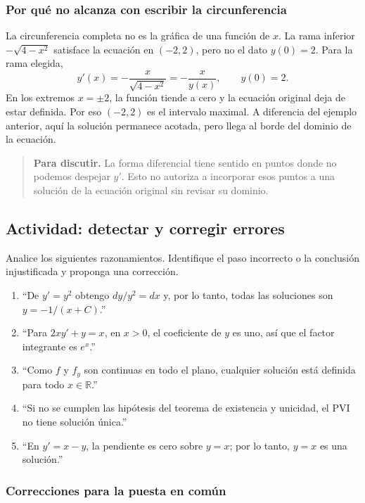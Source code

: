 \documentclass[12pt,a4paper]{article}
\begin{document}
	\subsubsection*{Por qué no alcanza con escribir la circunferencia}

	La circunferencia completa no es la gráfica de una función de \(x\). La rama inferior \(-\sqrt{4-x^2}\) satisface la ecuación en \((-2,2)\), pero no el dato \(y(0)=2\). Para la rama elegida,
	\[
	y'(x)=-\frac{x}{\sqrt{4-x^2}}=-\frac{x}{y(x)},
	\qquad y(0)=2.
	\]
	En los extremos \(x=\pm2\), la función tiende a cero y la ecuación original deja de estar definida. Por eso \((-2,2)\) es el intervalo maximal. A diferencia del ejemplo anterior, aquí la solución permanece acotada, pero llega al borde del dominio de la ecuación.

	\begin{quote}
		\textbf{Para discutir.} La forma diferencial tiene sentido en puntos donde no podemos despejar \(y'\). Esto no autoriza a incorporar esos puntos a una solución de la ecuación original sin revisar su dominio.
	\end{quote}

	\clearpage
	\subsection{Actividad: detectar y corregir errores}

	Analice los siguientes razonamientos. Identifique el paso incorrecto o la conclusión injustificada y proponga una corrección.

	\begin{enumerate}[label=\arabic*.]
		\item ``De \(y'=y^2\) obtengo \(dy/y^2=dx\) y, por lo tanto, todas las soluciones son \(y=-1/(x+C)\).''
		\item ``Para \(2xy'+y=x\), en \(x>0\), el coeficiente de \(y\) es uno, así que el factor integrante es \(e^x\).''
		\item ``Como \(f\) y \(f_y\) son continuas en todo el plano, cualquier solución está definida para todo \(x\in\mathbb R\).''
		\item ``Si no se cumplen las hipótesis del teorema de existencia y unicidad, el PVI no tiene solución única.''
		\item ``En \(y'=x-y\), la pendiente es cero sobre \(y=x\); por lo tanto, \(y=x\) es una solución.''
	\end{enumerate}

	\subsubsection*{Correcciones para la puesta en común}
\end{document}
